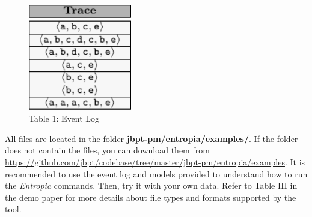 \begin{figure}[h!]
\begin{center}
\vspace{5mm}
\begin{minipage}{0.45\textwidth}
 \centering
\includegraphics[width=0.40\textwidth]{fig/eventLog.pdf} 
\caption*{ Table 1: Event Log}
\label{fig:Log}
\end{minipage}
\end{center}
\vspace{-4mm}
\end{figure}

All files are located in the folder \textbf{jbpt-pm\slash entropia\slash examples\slash}. If the folder does not contain the files, you can download them from \url{https://github.com/jbpt/codebase/tree/master/jbpt-pm/entropia/examples}. It is recommended to use the event log and models provided to understand how to run the \textit{Entropia} commands. Then, try it with your own data. Refer to Table III in the demo paper for more details about file types and formats supported by the tool.
